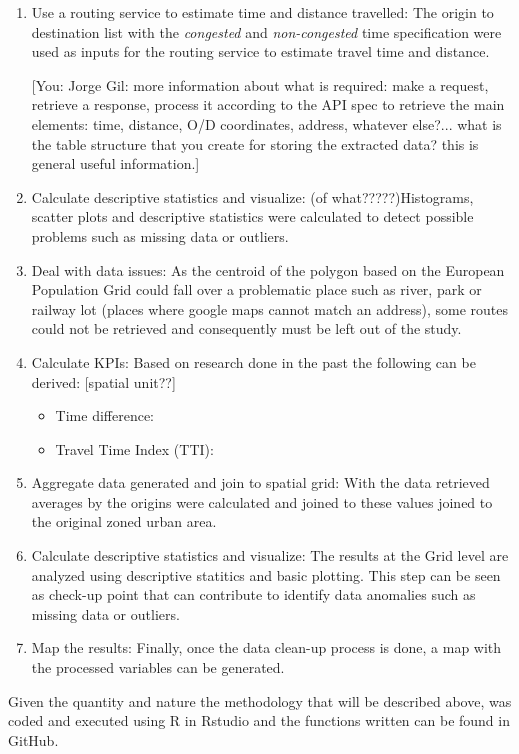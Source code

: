 \documentclass[a4paper]{jpconf}
\begin{document}
\begin{enumerate}[label=\arabic*)]
		\item Use a routing service to estimate time and distance travelled: The origin to destination list with the \textit{congested} and \textit{non-congested} time specification were used as inputs for the routing service to estimate travel time and distance. \par
		
		[You: Jorge Gil: more information about what is required: make a request, retrieve a response, process it according to the API spec to retrieve the main elements: time, distance, O/D coordinates, address, whatever else?... what is the table structure that you create for storing the extracted data? this is general useful information.]
		\item Calculate descriptive statistics and visualize: (of what?????)Histograms, scatter plots and descriptive statistics were calculated to detect possible  problems such as missing data or outliers. 
		\item Deal with data issues: As the centroid of the polygon based on the European Population Grid could fall over a problematic place such as river, park or railway lot (places where google maps cannot match an address), some routes could not be retrieved and consequently must be left out of the study.
		\item Calculate KPIs: Based on research done in the past the following can be derived:
		[spatial unit??]
		\begin{itemize}
			\item Time difference:	
			\item Travel Time Index (TTI):			
		\end{itemize}	
		\item Aggregate data generated and join to spatial grid: With the data retrieved averages by the origins were calculated and joined to these values joined to the original zoned urban area. 
		\item Calculate descriptive statistics and visualize: The results at the Grid level are analyzed using descriptive statitics and basic plotting. This step can be seen as check-up point that can contribute to identify data anomalies such as missing data or outliers. 
		\item Map the results: Finally, once the data clean-up process is done, a map with the processed variables can be generated.
	\end{enumerate}
	
	Given the quantity and nature the methodology that will be described above, was coded and executed using R in Rstudio and the functions written can be found in GitHub. \par
	
\end{document}
